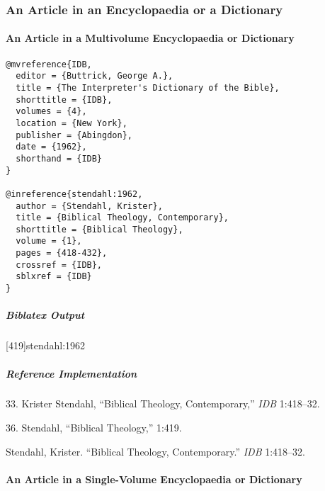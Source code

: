 \documentclass[a4paper]{article}
\newenvironment{biboutput}{%
  \subparagraph{Biblatex Output}
}{\color{black}}
\newenvironment{refimp}{%
  \subparagraph{Reference Implementation}
  \color{reference-colour}
  \rm
}{\par\color{black}}
\begin{document}
\subsubsection{An Article in an Encyclopaedia or a Dictionary}

\paragraph{An Article in a Multivolume Encyclopaedia or Dictionary}

\begin{lstlisting}
@mvreference{IDB,
  editor = {Buttrick, George A.},
  title = {The Interpreter's Dictionary of the Bible},
  shorttitle = {IDB},
  volumes = {4},
  location = {New York},
  publisher = {Abingdon},
  date = {1962},
  shorthand = {IDB}
}

@inreference{stendahl:1962,
  author = {Stendahl, Krister},
  title = {Biblical Theology, Contemporary},
  shorttitle = {Biblical Theology},
  volume = {1},
  pages = {418-432},
  crossref = {IDB},
  sblxref = {IDB}
}
\end{lstlisting}  

\begin{biboutput}
  [419]{stendahl:1962}
  \toggletrue{fullbibrefs}
  \togglefalse{fullbibrefs}
\end{biboutput}

\begin{refimp}
  \hspace*{\bibindent}33. Krister Stendahl, “Biblical Theology, Contemporary,”
  \emph{IDB} 1:418–32.
  
  \hspace*{\bibindent}36. Stendahl, “Biblical Theology,” 1:419.
  
  Stendahl, Krister. “Biblical Theology, Contemporary.” \emph{IDB} 1:418–32.

\end{refimp}

\paragraph{An Article in a Single-Volume Encyclopaedia or Dictionary}
\end{document}
